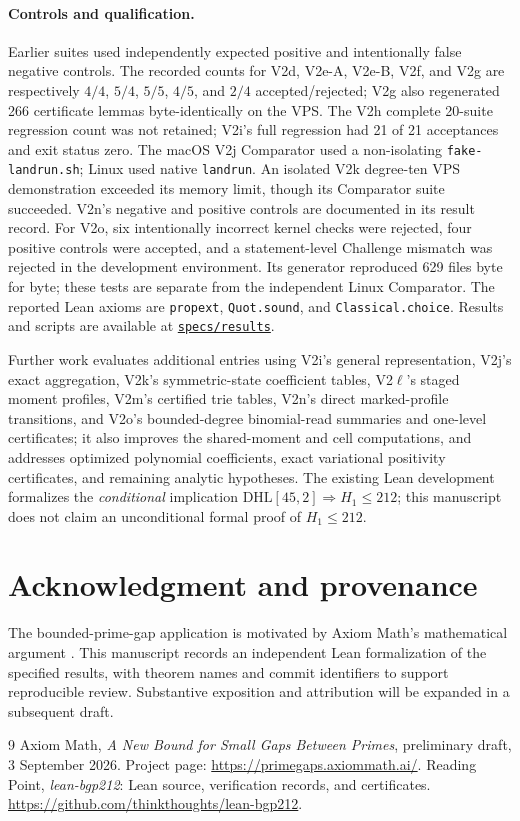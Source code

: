\documentclass[11pt]{article}
\newcommand{\code}[1]{\texttt{#1}}
\begin{document}
\paragraph{Controls and qualification.}
Earlier suites used independently expected positive and intentionally false
negative controls. The recorded counts for V2d, V2e-A, V2e-B, V2f, and V2g
are respectively $4/4$, $5/4$, $5/5$, $4/5$, and $2/4$ accepted/rejected;
V2g also regenerated 266 certificate lemmas byte-identically on the VPS.
The V2h complete 20-suite regression count was not retained; V2i's full
regression had 21 of 21 acceptances and exit status zero. The macOS V2j
Comparator used a non-isolating \code{fake-landrun.sh}; Linux used native
\code{landrun}. An isolated V2k degree-ten VPS demonstration exceeded its
memory limit, though its Comparator suite succeeded. V2n's negative and
positive controls are documented in its result record. For V2o, six
intentionally incorrect kernel checks were rejected, four positive controls
were accepted, and a statement-level Challenge mismatch was rejected in
the development environment. Its generator reproduced 629 files byte for
byte; these tests are separate from the independent Linux Comparator. The reported Lean
axioms are \code{propext}, \code{Quot.sound}, and \code{Classical.choice}.
Results and scripts are available at
\href{https://github.com/thinkthoughts/lean-bgp212/tree/main/specs/results}{\code{specs/results}}.

Further work evaluates additional entries using V2i's general representation,
V2j's exact aggregation, V2k's symmetric-state coefficient tables,
V2\ensuremath{\ell}'s staged moment profiles, V2m's certified trie
tables, V2n's direct marked-profile transitions, and V2o's bounded-degree
binomial-read summaries and one-level certificates; it also improves the shared-moment and cell computations,
and addresses optimized polynomial
coefficients, exact variational positivity certificates, and
remaining analytic hypotheses. The existing Lean development formalizes the
\emph{conditional} implication $\mathrm{DHL}[45,2]\Rightarrow H_1\le212$;
this manuscript does not claim an unconditional formal proof of $H_1\le212$.

\section*{Acknowledgment and provenance}
The bounded-prime-gap application is motivated by Axiom Math's mathematical argument
\cite{axiom}. This manuscript records an independent Lean formalization of the
specified results, with theorem names and commit identifiers to support reproducible
review. Substantive exposition and attribution will be expanded in a subsequent draft.

\begin{thebibliography}{9}
Axiom Math, \emph{A New Bound for Small Gaps Between Primes}, preliminary draft,
3 September 2026. Project page:
\url{https://primegaps.axiommath.ai/}.
Reading Point, \emph{lean-bgp212}: Lean source, verification records, and certificates.
\url{https://github.com/thinkthoughts/lean-bgp212}.
\end{thebibliography}
\end{document}
